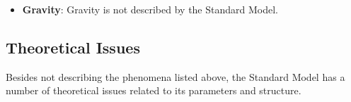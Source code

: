 \begin{itemize}

	\item \textbf{Gravity}: Gravity is not described by the Standard Model. 

\end{itemize}

\subsection{Theoretical Issues}\label{sec:bsm-theoretical-deficiencies}
Besides not describing the phenomena listed above, the Standard Model has a number of theoretical issues related to its parameters and structure.

